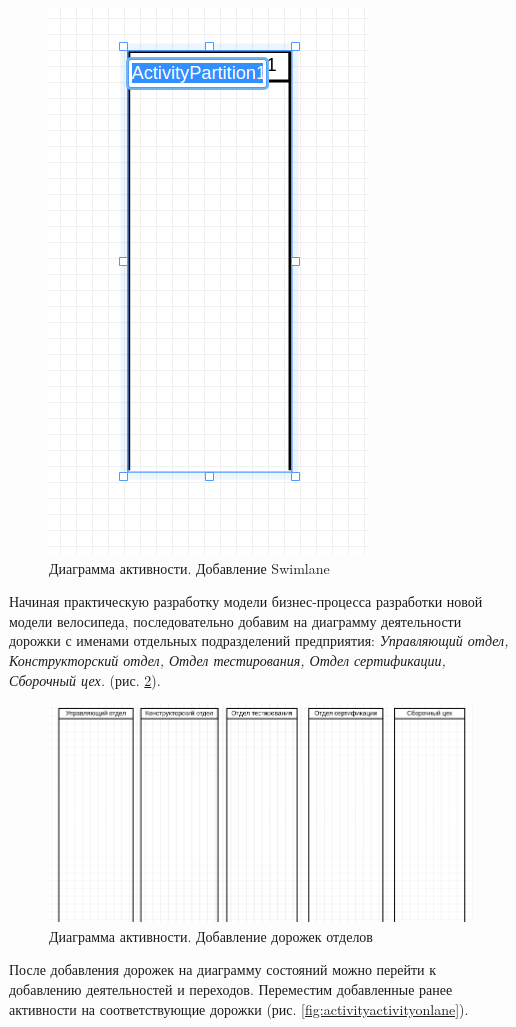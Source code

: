 \documentclass[a4paper,12pt]{report}
\begin{document}
\begin{figure}[h!]
	\centering
	\includegraphics[width=0.4\linewidth]{images/activityswimlane}
	\caption{Диаграмма активности. Добавление Swimlane}
	\label{fig:activityswimlane}
\end{figure}

Начиная практическую разработку модели бизнес-процесса разработки новой модели велосипеда, последовательно добавим на диаграмму деятельности дорожки с именами отдельных подразделений предприятия: \textit{Управляющий отдел, Конструкторский отдел, Отдел тестирования, Отдел сертификации, Сборочный цех.} (рис. \ref{fig:activityswimlaneall}).

\begin{figure}[h!]
	\centering
	\includegraphics[width=0.7\linewidth]{images/activityswimlaneall}
	\caption{Диаграмма активности. Добавление дорожек отделов}
	\label{fig:activityswimlaneall}
\end{figure}

После добавления дорожек на диаграмму состояний можно перейти к добавлению деятельностей и переходов. Переместим добавленные ранее активности на соответствующие дорожки (рис. \ref{fig:activityactivityonlane}).
\end{document}
